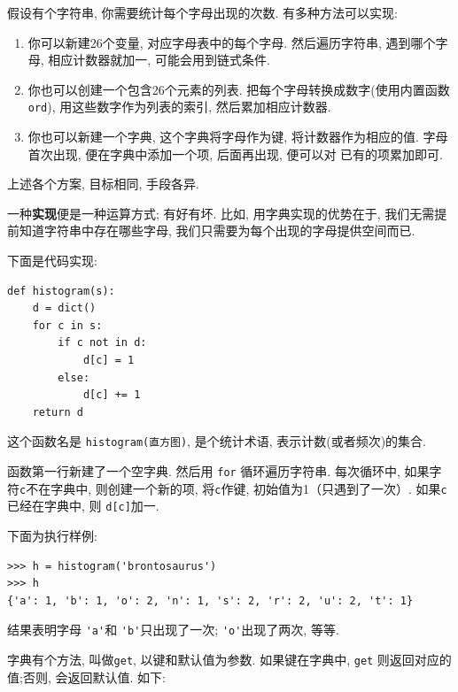 \documentclass[10pt]{book}
\begin{document}
假设有个字符串, 你需要统计每个字母出现的次数. 
有多种方法可以实现:

\begin{enumerate}

\item 你可以新建26个变量, 对应字母表中的每个字母. 
然后遍历字符串, 遇到哪个字母, 相应计数器就加一, 
可能会用到链式条件. 

\item 你也可以创建一个包含26个元素的列表. 
把每个字母转换成数字(使用内置函数{\tt ord}), 用这些数字作为列表的索引, 
然后累加相应计数器. 

\item 你也可以新建一个字典, 这个字典将字母作为键, 
将计数器作为相应的值. 
字母首次出现, 便在字典中添加一个项, 后面再出现, 便可以对
已有的项累加即可. 

\end{enumerate}

上述各个方案, 目标相同, 手段各异.

一种{\bf 实现}便是一种运算方式; 有好有坏. 
比如, 用字典实现的优势在于, 我们无需提前知道字符串中存在哪些字母, 
我们只需要为每个出现的字母提供空间而已. 

下面是代码实现:

\begin{verbatim}
def histogram(s):
    d = dict()
    for c in s:
        if c not in d:
            d[c] = 1
        else:
            d[c] += 1
    return d
\end{verbatim}
%
这个函数名是 {\tt histogram(直方图)}, 是个统计术语, 表示计数(或者频次)的集合.

函数第一行新建了一个空字典. 
然后用 {\tt for} 循环遍历字符串. 每次循环中, 如果字符{\tt c}不在字典中, 
则创建一个新的项, 将{\tt c}作键, 初始值为1（只遇到了一次）. 
如果{\tt c} 已经在字典中, 则 {\tt d[c]}加一.

下面为执行样例:

\begin{verbatim}
>>> h = histogram('brontosaurus')
>>> h
{'a': 1, 'b': 1, 'o': 2, 'n': 1, 's': 2, 'r': 2, 'u': 2, 't': 1}
\end{verbatim}
%

结果表明字母 \verb"'a'"和 \verb"'b'"只出现了一次;
\verb"'o'"出现了两次, 等等. 


字典有个方法, 叫做{\tt get}, 
以键和默认值为参数. 
如果键在字典中, {\tt get} 则返回对应的值;否则, 会返回默认值. 
如下:
\end{document}
